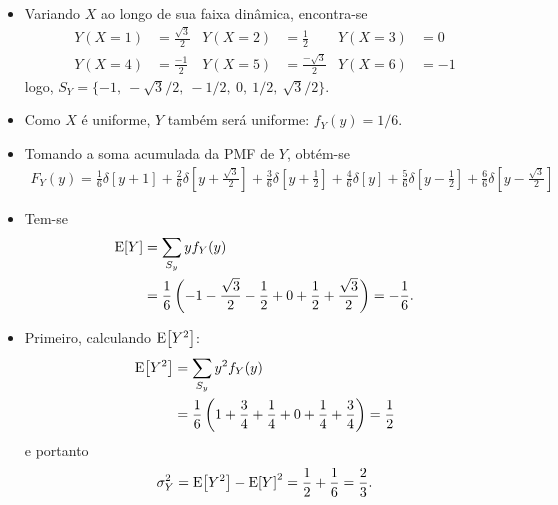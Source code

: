 \begin{itemize}
    \item [a)] 
    Variando $X$ ao longo de sua faixa dinâmica, encontra-se
    \begin{align}
        Y(X=1) &= \frac{\sqrt{3}}{2}  & Y(X=2) &= \frac{1}{2}         & Y(X=3) &= 0 \\
        Y(X=4) &= \frac{-1}{2}        & Y(X=5) &= \frac{-\sqrt{3}}{2} & Y(X=6) &= -1
    \end{align}
    logo, $S_Y = \{-1,\ -\sqrt{3}/2,\ -1/2,\ 0,\ 1/2,\ \sqrt{3}/2\}$.
    
    \item [b)] 
    Como $X$ é uniforme, $Y$ também será uniforme: $f_Y(y) = 1/6$.
    
    \item [c)] 
    Tomando a soma acumulada da PMF de $Y$, obtém-se
    \begin{align}
        F_Y(y) = 
        \frac{1}{6} \delta\left[y + 1\right] + 
        \frac{2}{6} \delta\left[y + \frac{\sqrt{3}}{2}\right] + 
        \frac{3}{6} \delta\left[y + \frac{1}{2}\right] + 
        \frac{4}{6} \delta[y] + 
        \frac{5}{6} \delta\left[y - \frac{1}{2}\right] + 
        \frac{6}{6} \delta\left[y - \frac{\sqrt{3}}{2}\right]
    \end{align}
    
    \item [d)] 
    Tem-se
    \begin{align}
        \mathrm{E}\!\left[Y\right] 
        &= \sum_{S_y} y f_Y(y) \\
        &= \frac{1}{6} \left(
            -1 -\frac{\sqrt{3}}{2} -\frac{1}{2} +0 +\frac{1}{2} +\frac{\sqrt{3}}{2}
        \right) 
        = -\frac{1}{6}.
    \end{align}
    
    \item [e)] 
    Primeiro, calculando $\mathrm{E}\!\left[Y^2\right]$:
    \begin{align}
        \mathrm{E}\!\left[Y^2\right] 
        &= \sum_{S_y} y^2 f_Y(y) \\
        &= \frac{1}{6} \left(
            1 +\frac{3}{4} +\frac{1}{4} +0 +\frac{1}{4} +\frac{3}{4}
        \right) 
        = \frac{1}{2}
    \end{align}
    e portanto
    \begin{equation}
        \sigma_Y^2 
        = \mathrm{E}\!\left[Y^2\right] - \mathrm{E}\!\left[Y\right]^2 
        = \frac{1}{2} + \frac{1}{6} 
        = \frac{2}{3}.
    \end{equation}
\end{itemize}